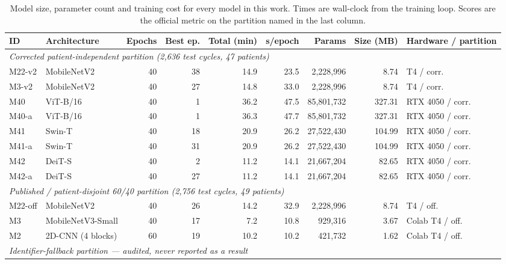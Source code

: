 \documentclass[journal,onecolumn]{IEEEtran}
\begin{document}
\begin{table}[!t]
\centering
\caption{Model size, parameter count and training cost for every model in this
work. Times are wall-clock from the training loop. Scores are the official metric
on the partition named in the last column.}
\label{tab:efficiency}
\scriptsize
\begin{tabular}{llrrrrrrl}
\toprule
ID & Architecture & Epochs & Best ep. & Total (min) & s/epoch & Params & Size (MB) & Hardware / partition \\
\midrule
\multicolumn{9}{l}{\emph{Corrected patient-independent partition (2{,}636 test cycles, 47 patients)}}\\
M22-v2 & MobileNetV2       & 40 & 38 & 14.9 & 23.5 & 2{,}228{,}996  & \phantom{00}8.74 & T4 / corr. \\
M3-v2  & MobileNetV2       & 40 & 27 & 14.8 & 33.0 & 2{,}228{,}996  & \phantom{00}8.74 & T4 / corr. \\
M40    & ViT-B/16          & 40 & \phantom{0}1 & 36.2 & 47.5 & 85{,}801{,}732 & 327.31 & RTX 4050 / corr. \\
M40-a  & ViT-B/16          & 40 & \phantom{0}1 & 36.3 & 47.7 & 85{,}801{,}732 & 327.31 & RTX 4050 / corr. \\
M41    & Swin-T            & 40 & 18 & 20.9 & 26.2 & 27{,}522{,}430 & 104.99 & RTX 4050 / corr. \\
M41-a  & Swin-T            & 40 & 31 & 20.9 & 26.2 & 27{,}522{,}430 & 104.99 & RTX 4050 / corr. \\
M42    & DeiT-S            & 40 & \phantom{0}2 & 11.2 & 14.1 & 21{,}667{,}204 & \phantom{0}82.65 & RTX 4050 / corr. \\
M42-a  & DeiT-S            & 40 & 27 & 11.2 & 14.1 & 21{,}667{,}204 & \phantom{0}82.65 & RTX 4050 / corr. \\
\midrule
\multicolumn{9}{l}{\emph{Published / patient-disjoint 60/40 partition (2{,}756 test cycles, 49 patients)}}\\
M22-off & MobileNetV2      & 40 & 26 & 14.2 & 32.9 & 2{,}228{,}996 & \phantom{00}8.74 & T4 / off. \\
M3     & MobileNetV3-Small & 40 & 17 & \phantom{0}7.2 & 10.8 & \phantom{0}929{,}316 & \phantom{00}3.67 & Colab T4 / off. \\
M2     & 2D-CNN (4 blocks) & 60 & 19 & 10.2 & 10.2 & \phantom{0}421{,}732 & \phantom{00}1.62 & Colab T4 / off. \\
\midrule
\multicolumn{9}{l}{\emph{Identifier-fallback partition --- audited, never reported as a result}}\\

\end{tabular}
\end{table}
\end{document}
